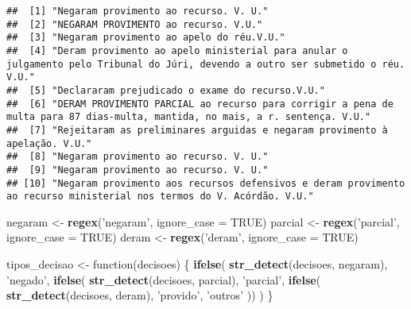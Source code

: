 \documentclass[]{book}
\newenvironment{Shaded}{\begin{snugshade}}{\end{snugshade}}
\newcommand{\KeywordTok}[1]{\textcolor[rgb]{0.13,0.29,0.53}{\textbf{{#1}}}}
\newcommand{\DataTypeTok}[1]{\textcolor[rgb]{0.13,0.29,0.53}{{#1}}}
\newcommand{\StringTok}[1]{\textcolor[rgb]{0.31,0.60,0.02}{{#1}}}
\newcommand{\OtherTok}[1]{\textcolor[rgb]{0.56,0.35,0.01}{{#1}}}
\newcommand{\NormalTok}[1]{{#1}}
\begin{document}
\begin{verbatim}
##  [1] "Negaram provimento ao recurso. V. U."                                                                                           
##  [2] "NEGARAM PROVIMENTO ao recurso. V.U."                                                                                            
##  [3] "Negaram provimento ao apelo do réu.V.U."                                                                                        
##  [4] "Deram provimento ao apelo ministerial para anular o julgamento pelo Tribunal do Júri, devendo a outro ser submetido o réu. V.U."
##  [5] "Declararam prejudicado o exame do recurso.V.U."                                                                                 
##  [6] "DERAM PROVIMENTO PARCIAL ao recurso para corrigir a pena de multa para 87 dias-multa, mantida, no mais, a r. sentença. V.U."    
##  [7] "Rejeitaram as preliminares arguidas e negaram provimento à apelação. V.U."                                                      
##  [8] "Negaram provimento ao recurso. V. U."                                                                                           
##  [9] "Negaram provimento ao recurso. V. U."                                                                                           
## [10] "Negaram provimento aos recursos defensivos e deram provimento ao recurso ministerial nos termos do V. Acórdão. V.U."
\end{verbatim}

\begin{Shaded}
\begin{Highlighting}[]
\NormalTok{negaram <-}\StringTok{ }\KeywordTok{regex}\NormalTok{(}\StringTok{'negaram'}\NormalTok{, }\DataTypeTok{ignore_case =} \OtherTok{TRUE}\NormalTok{)}
\NormalTok{parcial <-}\StringTok{ }\KeywordTok{regex}\NormalTok{(}\StringTok{'parcial'}\NormalTok{, }\DataTypeTok{ignore_case =} \OtherTok{TRUE}\NormalTok{)}
\NormalTok{deram <-}\StringTok{ }\KeywordTok{regex}\NormalTok{(}\StringTok{'deram'}\NormalTok{, }\DataTypeTok{ignore_case =} \OtherTok{TRUE}\NormalTok{)}

\NormalTok{tipos_decisao <-}\StringTok{ }\NormalTok{function(decisoes) \{}
  \KeywordTok{ifelse}\NormalTok{(}
    \KeywordTok{str_detect}\NormalTok{(decisoes, negaram), }\StringTok{'negado'}\NormalTok{, }\KeywordTok{ifelse}\NormalTok{(}
      \KeywordTok{str_detect}\NormalTok{(decisoes, parcial), }\StringTok{'parcial'}\NormalTok{, }\KeywordTok{ifelse}\NormalTok{(}
        \KeywordTok{str_detect}\NormalTok{(decisoes, deram), }\StringTok{'provido'}\NormalTok{, }\StringTok{'outros'}
    \NormalTok{))}
  \NormalTok{)}
\NormalTok{\}}
\end{Highlighting}
\end{Shaded}
\end{document}
